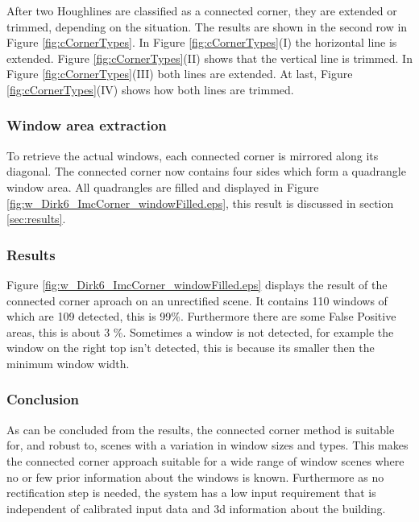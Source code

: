 After two Houghlines are classified as a connected corner, they are extended or
trimmed, depending on the situation. The results are shown in the second row in
Figure \ref{fig:cCornerTypes}.
In Figure \ref{fig:cCornerTypes}(I)  the horizontal line is extended.  Figure
\ref{fig:cCornerTypes}(II) shows that the vertical line is trimmed.  In Figure
\ref{fig:cCornerTypes}(III) both lines are extended.  At last, Figure
\ref{fig:cCornerTypes}(IV) shows how both lines are trimmed.


\subsubsection{Window area extraction}
To retrieve the actual windows, each connected corner is mirrored along its
diagonal. The connected corner now contains four sides which form a 
quadrangle window area.
All quadrangles are filled and displayed in Figure
\ref{fig:w_Dirk6_ImcCorner_windowFilled.eps}, this result is discussed in section
\ref{sec:results}.


\subsubsection{Results}


\newpage
{}

Figure \ref{fig:w_Dirk6_ImcCorner_windowFilled.eps} displays the result of the
connected corner aproach on an unrectified scene.  It contains 110 windows of
which are 109 detected, this is 99\%. Furthermore there are some False Positive
areas, this is about 3 \%.
Sometimes a window is not detected, for example the window on the right top
isn't detected, this is because its smaller then the minimum window width.\\

\subsubsection{Conclusion}
As can be concluded from the results, the connected corner method is suitable
for, and robust to, scenes with a variation in window sizes and types. This
	makes the connected corner approach suitable for a wide range of window
	scenes where no or few prior information about the windows is known.
	Furthermore as no rectification step is needed, the system has a low input
	requirement that is independent of calibrated input data and 3d information
	about the building.

